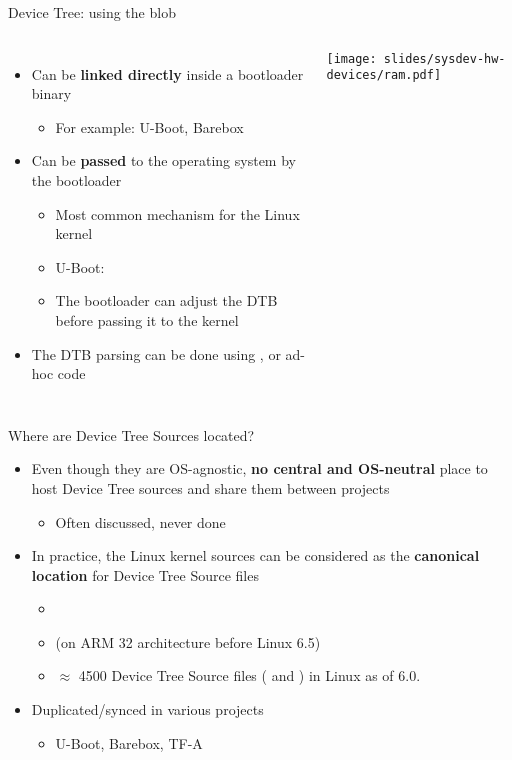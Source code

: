 \begin{frame}{Device Tree: using the blob}
  \begin{columns}
    \begin{itemize}
    \item Can be {\bf linked directly} inside a bootloader binary
      \begin{itemize}
      \item For example: U-Boot, Barebox
      \end{itemize}
    \item Can be {\bf passed} to the operating system by the bootloader
      \begin{itemize}
      \item Most common mechanism for the Linux kernel
      \item U-Boot: 
      \item The bootloader can adjust the DTB before passing it to the
        kernel
      \end{itemize}
    \item The DTB parsing can be done using , or ad-hoc
      code
    \end{itemize}
    \texttt{[image: slides/sysdev-hw-devices/ram.pdf]}
  \end{columns}
\end{frame}

\begin{frame}{Where are Device Tree Sources located?}
  \begin{itemize}
  \item Even though they are OS-agnostic, {\bf no central and
      OS-neutral} place to host Device Tree sources and share them
    between projects
    \begin{itemize}
    \item Often discussed, never done
    \end{itemize}
  \item In practice, the Linux kernel sources can be considered as the
    {\bf canonical location} for Device Tree Source files
    \begin{itemize}
    \item {}
    \item {} (on ARM 32 architecture before Linux 6.5)
    \item $\approx$ 4500 Device Tree Source files ( and
          ) in Linux as of 6.0.
    \end{itemize}
  \item Duplicated/synced in various projects
    \begin{itemize}
    \item U-Boot, Barebox, TF-A
    \end{itemize}
  \end{itemize}
\end{frame}

